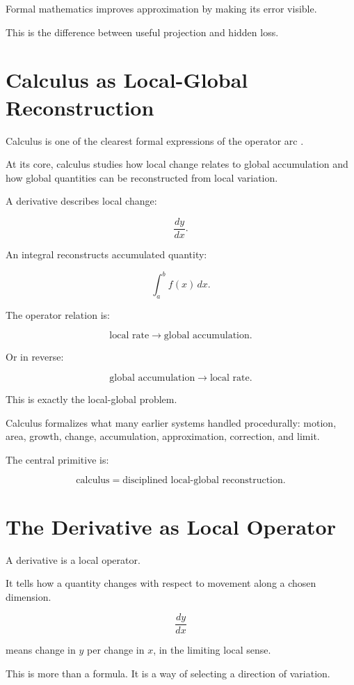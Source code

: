 \documentclass[11pt]{book}
\begin{document}
Formal mathematics improves approximation by making its error visible.

This is the difference between useful projection and hidden loss.

\section{Calculus as Local-Global Reconstruction}

Calculus is one of the clearest formal expressions of the operator arc \cite{Leibniz1697Binary}.

At its core, calculus studies how local change relates to global accumulation and how global quantities can be reconstructed from local variation.

A derivative describes local change:

\[
\frac{dy}{dx}.
\]

An integral reconstructs accumulated quantity:

\[
\int_a^b f(x)\,dx.
\]

The operator relation is:

\[
\text{local rate}
\rightarrow
\text{global accumulation}.
\]

Or in reverse:

\[
\text{global accumulation}
\rightarrow
\text{local rate}.
\]

This is exactly the local-global problem.

Calculus formalizes what many earlier systems handled procedurally: motion, area, growth, change, accumulation, approximation, correction, and limit.

The central primitive is:

\[
\text{calculus} = \text{disciplined local-global reconstruction}.
\]

\section{The Derivative as Local Operator}

A derivative is a local operator.

It tells how a quantity changes with respect to movement along a chosen dimension.

\[
\frac{dy}{dx}
\]

means change in \(y\) per change in \(x\), in the limiting local sense.

This is more than a formula. It is a way of selecting a direction of variation.
\end{document}
